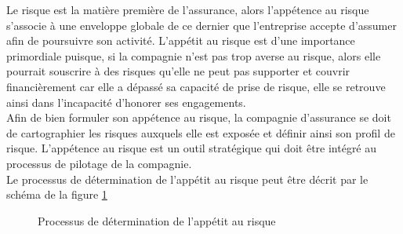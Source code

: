 \documentclass[11pt]{article}
\begin{document}
Le risque est la matière première de l'assurance, alors l'appétence au risque s'associe à une enveloppe globale de ce dernier que l'entreprise accepte d'assumer afin de poursuivre son activité. L'appétit au risque est d'une importance primordiale puisque, si la compagnie n'est pas trop averse au risque, alors elle pourrait souscrire à des risques qu'elle ne peut pas supporter et couvrir financièrement car elle a dépassé sa capacité de prise de risque, elle se retrouve ainsi dans l'incapacité d'honorer ses engagements.\\
Afin de bien formuler son appétence au risque, la compagnie d'assurance se doit de cartographier les risques auxquels elle est exposée et définir ainsi son profil de risque. L'appétence au risque est un outil stratégique qui doit être intégré au processus de pilotage de la compagnie.\\
Le processus de détermination de l'appétit au risque peut être décrit par le schéma de la figure \ref{fig:appetit}\\

\begin{figure}
\begin{center}
\caption{Processus de détermination de l'appétit au risque} \label{fig:appetit}
\end{center}
\end{figure}
\end{document}
